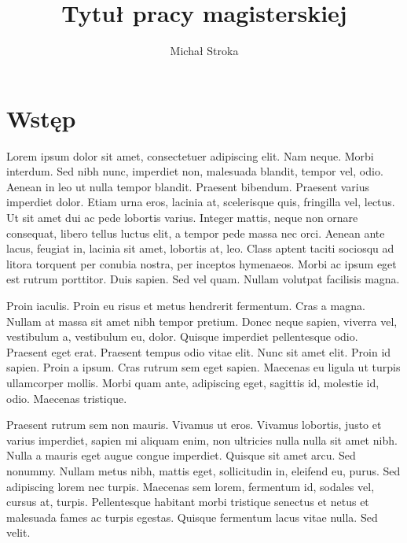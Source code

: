 \documentclass[printmode]{mgr}
\title{Tytuł pracy magisterskiej}
\author{Michał Stroka}
\begin{document}

\maketitle %

\tableofcontents %

\chapter{Wstęp}
Lorem ipsum dolor sit amet, consectetuer adipiscing elit. Nam
neque. Morbi interdum. Sed nibh nunc, imperdiet non, malesuada
blandit, tempor vel, odio. Aenean in leo ut nulla tempor
blandit. Praesent bibendum. Praesent varius imperdiet dolor. Etiam
urna eros, lacinia at, scelerisque quis, fringilla vel, lectus. Ut sit
amet dui ac pede lobortis varius. Integer mattis, neque non ornare
consequat, libero tellus luctus elit, a tempor pede massa nec
orci. Aenean ante lacus, feugiat in, lacinia sit amet, lobortis at,
leo. Class aptent taciti sociosqu ad litora torquent per conubia
nostra, per inceptos hymenaeos. Morbi ac ipsum eget est rutrum
porttitor. Duis sapien. Sed vel quam. Nullam volutpat facilisis magna.

Proin iaculis. Proin eu risus et metus hendrerit fermentum. Cras a
magna. Nullam at massa sit amet nibh tempor pretium. Donec neque
sapien, viverra vel, vestibulum a, vestibulum eu, dolor. Quisque
imperdiet pellentesque odio. Praesent eget erat. Praesent tempus odio
vitae elit. Nunc sit amet elit. Proin id sapien. Proin a ipsum. Cras
rutrum sem eget sapien. Maecenas eu ligula ut turpis ullamcorper
mollis. Morbi quam ante, adipiscing eget, sagittis id, molestie id,
odio. Maecenas tristique.

Praesent rutrum sem non mauris. Vivamus ut eros. Vivamus lobortis,
justo et varius imperdiet, sapien mi aliquam enim, non ultricies nulla
nulla sit amet nibh. Nulla a mauris eget augue congue
imperdiet. Quisque sit amet arcu. Sed nonummy. Nullam metus nibh,
mattis eget, sollicitudin in, eleifend eu, purus. Sed adipiscing lorem
nec turpis. Maecenas sem lorem, fermentum id, sodales vel, cursus at,
turpis. Pellentesque habitant morbi tristique senectus et netus et
malesuada fames ac turpis egestas. Quisque fermentum lacus vitae
nulla. Sed velit.
\end{document}
